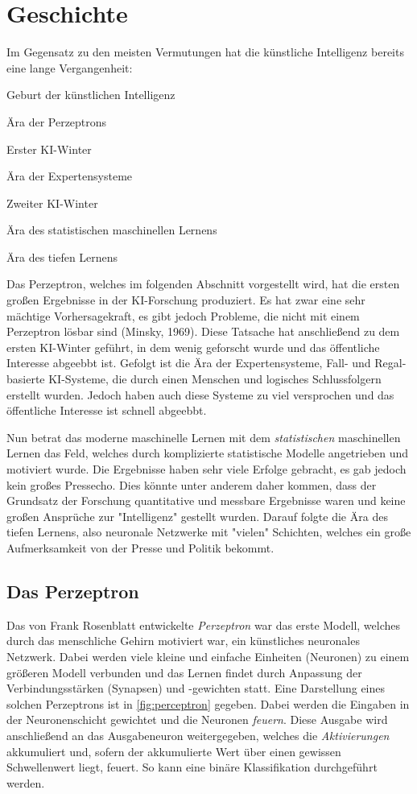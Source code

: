 	\section{Geschichte}
		Im Gegensatz zu den meisten Vermutungen hat die künstliche Intelligenz bereits eine lange Vergangenheit:
		\begin{description}[leftmargin = 2cm]
			\item[1950er] Geburt der künstlichen Intelligenz
			\item[1960er] Ära der Perzeptrons
			\item[1970er] Erster KI-Winter
			\item[1980er] Ära der Expertensysteme
			\item[1990er] Zweiter KI-Winter
			\item[2000er] Ära des statistischen maschinellen Lernens
			\item[2000er] Ära des tiefen Lernens
		\end{description}
		Das Perzeptron, welches im folgenden Abschnitt vorgestellt wird, hat die ersten großen Ergebnisse in der KI-Forschung produziert. Es hat zwar eine sehr mächtige Vorhersagekraft, es gibt jedoch Probleme, die nicht mit einem Perzeptron lösbar sind (Minsky, 1969). Diese Tatsache hat anschließend zu dem ersten KI-Winter geführt, in dem wenig geforscht wurde und das öffentliche Interesse abgeebbt ist. Gefolgt ist die Ära der Expertensysteme, Fall- und Regal-basierte KI-Systeme, die durch einen Menschen und logisches Schlussfolgern erstellt wurden. Jedoch haben auch diese Systeme zu viel versprochen und das öffentliche Interesse ist schnell abgeebbt.

		Nun betrat das moderne maschinelle Lernen mit dem \emph{statistischen} maschinellen Lernen das Feld, welches durch komplizierte statistische Modelle angetrieben und motiviert wurde. Die Ergebnisse haben sehr viele Erfolge gebracht, es gab jedoch kein großes Pressecho. Dies könnte unter anderem daher kommen, dass der Grundsatz der Forschung quantitative und messbare Ergebnisse waren und keine großen Ansprüche zur "Intelligenz" gestellt wurden. Darauf folgte die Ära des tiefen Lernens, also neuronale Netzwerke mit "vielen" Schichten, welches ein große Aufmerksamkeit von der Presse und Politik bekommt.

		\subsection{Das Perzeptron}
			Das von Frank Rosenblatt entwickelte \emph{Perzeptron} war das erste Modell, welches durch das menschliche Gehirn motiviert war, ein künstliches neuronales Netzwerk. Dabei werden viele kleine und einfache Einheiten (Neuronen) zu einem größeren Modell verbunden und das Lernen findet durch Anpassung der Verbindungsstärken (Synapsen) und -gewichten statt. Eine Darstellung eines solchen Perzeptrons ist in \autoref{fig:perceptron} gegeben. Dabei werden die Eingaben in der Neuronenschicht gewichtet und die Neuronen \emph{feuern}. Diese Ausgabe wird anschließend an das Ausgabeneuron weitergegeben, welches die \emph{Aktivierungen} akkumuliert und, sofern der akkumulierte Wert über einen gewissen Schwellenwert liegt, feuert. So kann eine binäre Klassifikation durchgeführt werden.

